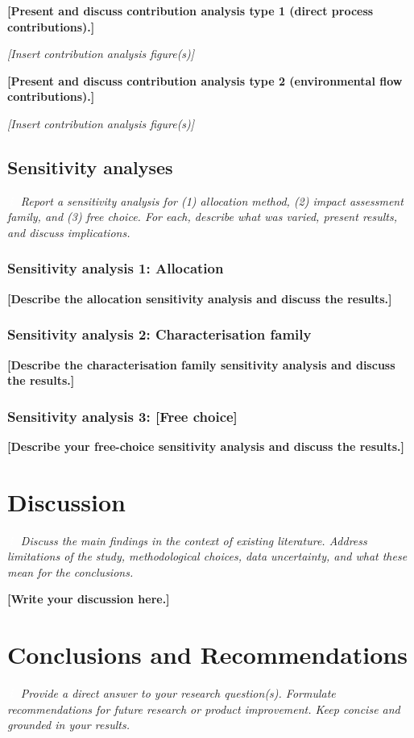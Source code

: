 \documentclass[10pt]{article}
\newcommand{\placeholder}[1]{\textcolor{lcaph}{\textbf{#1}}}    %
\newcommand{\placeholderit}[1]{\textcolor{lcaph}{\textit{#1}}}  %
\newcommand{\infoicon}{{\setlength{\fboxsep}{1pt}\colorbox{lcablue}{\textcolor{white}{\upshape\bfseries\,i\,}}}}
\newcommand{\guidance}[1]{\par\noindent\colorbox{lcabox}{\parbox{\dimexpr\linewidth-2\fboxsep}{\setlength{\parskip}{2pt}\small\itshape\infoicon\ \color{lcatext}#1}}\par}
\begin{document}
\placeholder{[Present and discuss contribution analysis type 1 (direct process contributions).]}

\placeholderit{[Insert contribution analysis figure(s)]}

\placeholder{[Present and discuss contribution analysis type 2 (environmental flow contributions).]}

\placeholderit{[Insert contribution analysis figure(s)]}

\subsection{Sensitivity analyses}
\guidance{Report a sensitivity analysis for (1) allocation method, (2) impact assessment family, and (3) free choice. For each, describe what was varied, present results, and discuss implications.}

\subsubsection{Sensitivity analysis 1: Allocation}
\placeholder{[Describe the allocation sensitivity analysis and discuss the results.]}

\subsubsection{Sensitivity analysis 2: Characterisation family}
\placeholder{[Describe the characterisation family sensitivity analysis and discuss the results.]}

\subsubsection{Sensitivity analysis 3: [Free choice]}
\placeholder{[Describe your free-choice sensitivity analysis and discuss the results.]}

\section{Discussion}
\guidance{Discuss the main findings in the context of existing literature. Address limitations of the study, methodological choices, data uncertainty, and what these mean for the conclusions.}

\placeholder{[Write your discussion here.]}

\section{Conclusions and Recommendations}
\guidance{Provide a direct answer to your research question(s). Formulate recommendations for future research or product improvement. Keep concise and grounded in your results.}
\end{document}
